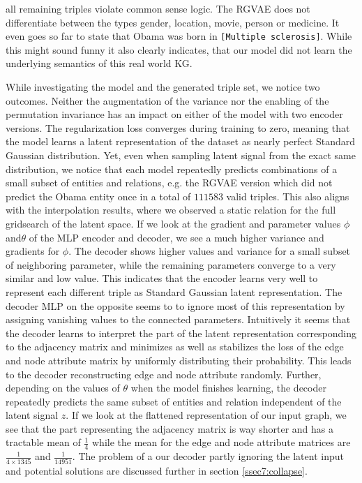 all remaining triples violate common sense logic. The RGVAE does not differentiate between the types gender, location, movie, person or medicine. It even goes so far to state that Obama was born in \texttt{[Multiple sclerosis]}. While this might sound funny it also clearly indicates, that our model did not learn the underlying semantics of this real world KG.

While investigating the model and the generated triple set, we notice two outcomes. Neither the augmentation of the variance nor the enabling of the permutation invariance has an impact on either of the model with two encoder versions. The regularization loss converges during training to zero, meaning that the model learns a latent representation of the dataset as  nearly perfect Standard Gaussian distribution. Yet, even when sampling latent signal from the exact same distribution, we notice that each model repeatedly predicts combinations of a small subset of entities and relations, e.g. the RGVAE version which did not predict the Obama entity once in a total of $111583$ valid triples. This also aligns with the interpolation results, where we observed a static relation for the full gridsearch of the latent space. If we look at the gradient and parameter values $\phi$ and$\theta$ of the MLP encoder and decoder, we see a much higher variance and gradients for $\phi$. The decoder shows higher values and variance for a small subset of neighboring parameter, while the remaining parameters converge to a very similar and low value. This indicates that the encoder learns very well to represent each different triple as Standard Gaussian latent representation. The decoder MLP on the opposite seems to to ignore most of this representation by assigning vanishing values to the connected parameters. Intuitively it seems that the decoder learns to interpret the part of the latent representation corresponding to the adjacency matrix and minimizes as well as stabilizes the loss of the edge and node attribute matrix by uniformly distributing their probability. This leads to the decoder reconstructing edge and node attribute randomly. Further, depending on the values of $\theta$ when the model finishes learning, the decoder repeatedly predicts the same subset of entities and relation independent of the latent signal $z$. If we look at the flattened representation of our input graph, we see that the part representing the adjacency matrix is way shorter and has a tractable mean of $\frac{1}{4}$ while the mean for the edge and node attribute matrices are $\frac{1}{{4 \times 1345}}$ and $\frac{1}{14951}$. The problem of a our decoder partly ignoring the latent input and potential solutions are discussed further in section \ref{ssec7:collapse}. 


